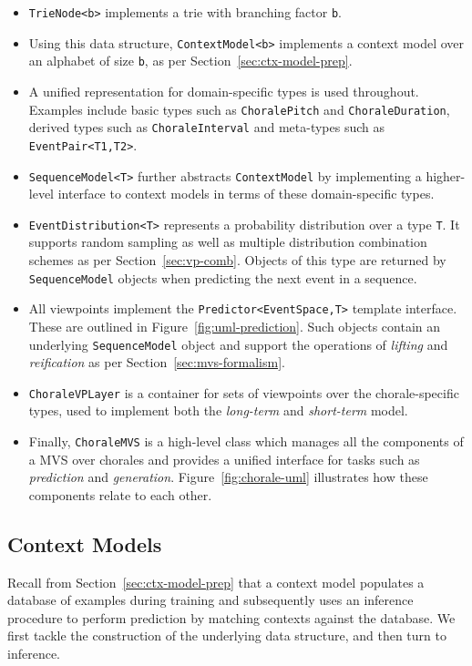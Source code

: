 \documentclass[12pt,a4paper,twoside,openright]{report}
\begin{document}
\begin{itemize}
  \item \texttt{TrieNode<b>} implements a trie with branching factor \texttt{b}.
  \item Using this data structure, \texttt{ContextModel<b>} implements a context
    model over an alphabet of size \texttt{b}, as per
    Section~\ref{sec:ctx-model-prep}.   
  \item A unified representation for domain-specific types is used throughout.
    Examples include basic types such as \texttt{ChoralePitch} and
    \texttt{ChoraleDuration}, derived types such as \texttt{ChoraleInterval} and
    meta-types such as \texttt{EventPair<T1,T2>}.
  \item \texttt{SequenceModel<T>} further abstracts \texttt{ContextModel} by
    implementing a higher-level interface to context models in terms of these
    domain-specific types.
  \item \texttt{EventDistribution<T>} represents a probability distribution over
    a type \texttt{T}. It supports random sampling as well as multiple
    distribution combination schemes as per Section~\ref{sec:vp-comb}. Objects
    of this type are returned by \texttt{SequenceModel} objects when predicting
    the next event in a sequence.
  \item All viewpoints implement the \texttt{Predictor<EventSpace,T>} template
    interface. These are outlined in Figure~\ref{fig:uml-prediction}. Such
    objects contain an underlying \texttt{SequenceModel} object and support the
    operations of \emph{lifting} and \emph{reification} as per
    Section~\ref{sec:mvs-formalism}.
  \item \texttt{ChoraleVPLayer} is a container for sets of viewpoints over the
    chorale-specific types, used to implement both the \emph{long-term} and
    \emph{short-term} model.
  \item Finally, \texttt{ChoraleMVS} is a high-level class which manages all the
    components of a MVS over chorales and provides a unified interface for tasks
    such as \emph{prediction} and \emph{generation}.
    Figure~\ref{fig:chorale-uml} illustrates how these components relate to each
    other.
\end{itemize}

\subsection{Context Models}

Recall from Section~\ref{sec:ctx-model-prep} that a context model populates a
database of examples during training and subsequently uses an inference
procedure to perform prediction by matching contexts against the database. We
first tackle the construction of the underlying data structure, and then turn to
inference.
\end{document}
